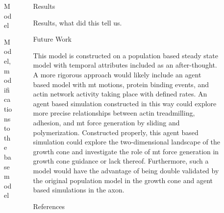 \documentclass{beamer}
\newlength{\sepwidth}
\newlength{\colwidth}
\newcommand{\separatorcolumn}{\begin{column}{\sepwidth}\end{column}}
\begin{document}
\begin{frame}[t]
\begin{columns}[t]
\begin{column}{\colwidth}
\end{column}
\separatorcolumn%


\begin{column}{\colwidth}

\begin{block}{Model}

Model, modifications to the base model

\end{block}

\end{column}
\separatorcolumn%


\begin{column}{\colwidth}

\begin{block}{Results}

Results, what did this tell us.

\end{block}

\begin{block}{Future Work}

This model is constructed on a population based steady state model with temporal attributes included as an after-thought. A more rigorous approach would likely include an agent based model with mt motions, protein binding events, and actin network activity taking place with defined rates. An agent based simulation constructed in this way could explore more precise relationships between actin treadmilling, adhesion, and mt force generation by sliding and polymerization. Constructed properly, this agent based simulation could explore the two-dimensional landscape of the growth cone and investigate the role of mt force generation in growth cone guidance or lack thereof. Furthermore, such a model would have the advantage of being double validated by the original population model in the growth cone and agent based simulations in the axon.

\end{block}

\begin{block}{References}

\fontsize{16pt}{12pt}\selectfont
\nocite{craig2015pb, craig2012bj, devincentiis2020jn, kalil2005con, nedelec1997n13, raffa2023scdb, sanchez-huertas2021fmn}



\end{block}

\end{column}
\separatorcolumn%

\end{columns}
\end{frame}
\end{document}
